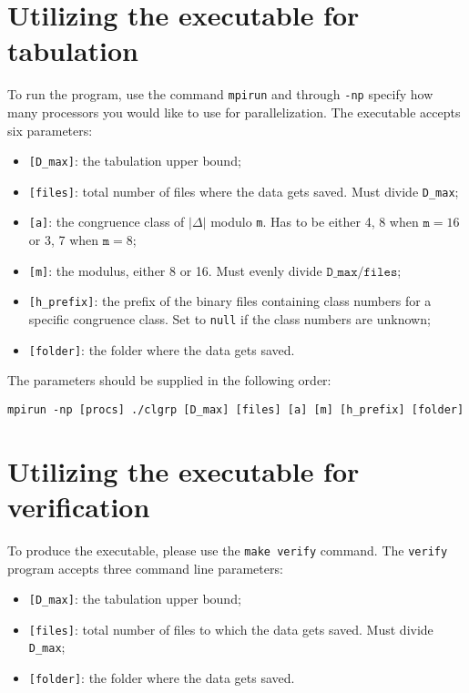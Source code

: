 \documentclass[a4paper,10pt]{article}
\newcommand{\code}{\lstinline}
\begin{document}
\section{Utilizing the executable for tabulation} \label{subsec:clgrp_exe}

To run the program, use the command \code{mpirun} and through \code{-np} specify how many processors you would like to use for parallelization. The executable accepts six parameters:

\begin{itemize}
\item \code{[D_max]}: the tabulation upper bound;
\item \code{[files]}: total number of files where the data gets saved. Must divide \code{D_max};
\item \code{[a]}: the congruence class of $|\Delta|$ modulo \code{m}. Has to be either 4, 8 when $\texttt{m}=16$ or 3, 7 when $\texttt{m}=8$;
\item \code{[m]}: the modulus, either 8 or 16. Must evenly divide $\texttt{D\_max} / \texttt{files}$;
\item \code{[h_prefix]}: the prefix of the binary files containing class numbers for a specific congruence class. Set to \code{null} if the class numbers are unknown;
\item \code{[folder]}: the folder where the data gets saved.
\end{itemize}

The parameters should be supplied in the following order:

\begin{lstlisting}
mpirun -np [procs] ./clgrp [D_max] [files] [a] [m] [h_prefix] [folder]
\end{lstlisting}





\section{Utilizing the executable for verification} \label{subsec:verify_exe}

To produce the executable, please use the \code{make verify} command. The \code{verify} program accepts three command line parameters:

\begin{itemize}
\item \code{[D_max]}: the tabulation upper bound;
\item \code{[files]}: total number of files to which the data gets saved. Must divide \code{D_max};
\item \code{[folder]}: the folder where the data gets saved.
\end{itemize}
\end{document}
